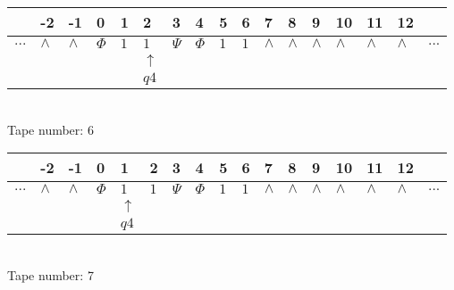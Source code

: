 \documentclass{article}
\begin{document}
\begin{table}[H]
\centering
\begin{tabular}{lllllllllllllllll}
 & -2 & -1 & 0 & 1 & 2 & 3 & 4 & 5 & 6 & 7 & 8 & 9 & 10 & 11 & 12 & \\
\hline
$...$ & \multicolumn{1}{|l|}{$\wedge$} & \multicolumn{1}{|l|}{$\wedge$} & \multicolumn{1}{|l|}{$\Phi$} & \multicolumn{1}{|l|}{$1$} & \multicolumn{1}{|l|}{$1$} & \multicolumn{1}{|l|}{$\Psi$} & \multicolumn{1}{|l|}{$\Phi$} & \multicolumn{1}{|l|}{$1$} & \multicolumn{1}{|l|}{$1$} & \multicolumn{1}{|l|}{$\wedge$} & \multicolumn{1}{|l|}{$\wedge$} & \multicolumn{1}{|l|}{$\wedge$} & \multicolumn{1}{|l|}{$\wedge$} & \multicolumn{1}{|l|}{$\wedge$} & \multicolumn{1}{|l|}{$\wedge$} & $...$\\
\hline
&  &  &  &  & $\uparrow$ &  &  &  &  &  &  &  &  &  &  &  \\
&  &  &  &  & $ q4 $ &  &  &  &  &  &  &  &  &  &  &  \\
\end{tabular}
\\
Tape number: 6
\noindent\makebox[\linewidth]{\hdashrule{\textwidth}{1pt}{1pt}}\end{table}

\begin{table}[H]
\centering
\begin{tabular}{lllllllllllllllll}
 & -2 & -1 & 0 & 1 & 2 & 3 & 4 & 5 & 6 & 7 & 8 & 9 & 10 & 11 & 12 & \\
\hline
$...$ & \multicolumn{1}{|l|}{$\wedge$} & \multicolumn{1}{|l|}{$\wedge$} & \multicolumn{1}{|l|}{$\Phi$} & \multicolumn{1}{|l|}{$1$} & \multicolumn{1}{|l|}{$1$} & \multicolumn{1}{|l|}{$\Psi$} & \multicolumn{1}{|l|}{$\Phi$} & \multicolumn{1}{|l|}{$1$} & \multicolumn{1}{|l|}{$1$} & \multicolumn{1}{|l|}{$\wedge$} & \multicolumn{1}{|l|}{$\wedge$} & \multicolumn{1}{|l|}{$\wedge$} & \multicolumn{1}{|l|}{$\wedge$} & \multicolumn{1}{|l|}{$\wedge$} & \multicolumn{1}{|l|}{$\wedge$} & $...$\\
\hline
&  &  &  & $\uparrow$ &  &  &  &  &  &  &  &  &  &  &  &  \\
&  &  &  & $ q4 $ &  &  &  &  &  &  &  &  &  &  &  &  \\
\end{tabular}
\\
Tape number: 7
\noindent\makebox[\linewidth]{\hdashrule{\textwidth}{1pt}{1pt}}\end{table}
\end{document}
